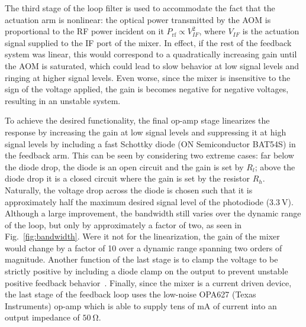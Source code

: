 \documentclass[twocolumn,aps,pra,showpacs,preprintnumbers,bibnotes]{revtex4-1}
\newcommand\unit[2]{\ensuremath{#1~\mathrm{{#2}}}}
\begin{document}
The third stage of the loop filter is used to accommodate the fact that the actuation arm is nonlinear: the optical power transmitted by the AOM is proportional to the RF power incident on it $P_{\mathrm{rf}}\propto V_{IF}^2$, where $V_{IF}$ is the actuation signal supplied to the IF port of the mixer.
In effect, if the rest of the feedback system was linear, this would correspond to a quadratically increasing gain until the AOM is saturated, which could lead to slow behavior at low signal levels and ringing at higher signal levels.
Even worse, since the mixer is insensitive to the sign of the voltage applied, the gain is becomes negative for negative voltages, resulting in an unstable system.

To achieve the desired functionality, the final op-amp stage linearizes the response by increasing the gain at low signal levels and suppressing it at high signal levels by including a fast Schottky diode (ON Semiconductor BAT54S) in the feedback arm.
This can be seen by considering two extreme cases: far below the diode drop, the diode is an open circuit and the gain is set by $R_l$; above the diode drop it is a closed circuit where the gain is set by the resistor $R_h$.
Naturally, the voltage drop across the diode is chosen such that it is approximately half the maximum desired signal level of the photodiode (\unit{3.3}{V}).
Although a large improvement, the bandwidth still varies over the dynamic range of the loop, but only by approximately a factor of two, as seen in Fig.~\ref{fig:bandwidth}.
Were it not for the linearization, the gain of the mixer would change by a factor of 10 over a dynamic range spanning two orders of magnitude.
Another function of the last stage is to clamp the voltage to be strictly positive by including a diode clamp on the output to prevent unstable positive feedback behavior~\cite{Horowitz2015}.
Finally, since the mixer is a current driven device, the last stage of the feedback loop uses the low-noise OPA627 (Texas Instruments) op-amp which is able to supply tens of mA of current into an output impedance of \unit{50}{\Omega}.
\end{document}

